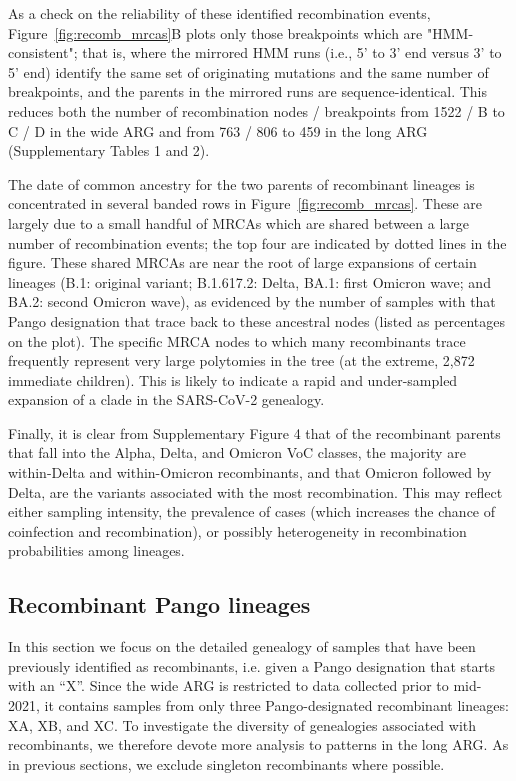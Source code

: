 \documentclass{article}
\begin{document}
As a check on the reliability of these identified recombination events,
Figure~\ref{fig:recomb_mrcas}B  plots only those breakpoints which are
"HMM-consistent"; that is, where the mirrored HMM runs (i.e., 5’ to 3’ end
versus 3’ to 5’ end) identify the same set of originating mutations and the
same number of breakpoints, and the parents in the mirrored runs are
sequence-identical. This reduces both the number of recombination nodes /
breakpoints from 1522 / B to C / D in the wide ARG and from 763 / 806 to 459 in
the long ARG (Supplementary Tables 1 and 2).

The date of common ancestry for the two parents of recombinant lineages is
concentrated in several banded rows in Figure~\ref{fig:recomb_mrcas}. These are
largely due to a small handful of MRCAs which are shared between a large number
of recombination events; the top four are indicated by dotted lines in the
figure. These shared MRCAs are near the root of large expansions of certain
lineages (B.1: original variant;  B.1.617.2: Delta, BA.1: first Omicron wave;
and BA.2: second Omicron wave), as evidenced by the number of samples with that
Pango designation that trace back to these ancestral nodes (listed as
percentages on the plot). The specific MRCA nodes to which many recombinants
trace frequently represent very large polytomies in the tree (at the extreme,
2,872 immediate children). This is likely to indicate a rapid and under-sampled
expansion of a clade in the SARS-CoV-2 genealogy.

Finally, it is clear from Supplementary Figure 4 that of the recombinant
parents that fall into the Alpha, Delta, and Omicron VoC classes, the majority
are within-Delta and within-Omicron recombinants, and that Omicron followed by
Delta, are the variants associated with the most recombination. This may
reflect either sampling intensity, the prevalence of cases (which increases the
chance of coinfection and recombination), or possibly heterogeneity in
recombination probabilities among lineages.

\subsection{Recombinant Pango lineages}

In this section we focus on the detailed genealogy of samples that have been
previously identified as recombinants, i.e. given a Pango designation that
starts with an ``X''. Since the wide ARG is restricted to data collected prior
to mid-2021, it contains samples from only three Pango-designated recombinant
lineages: XA, XB, and XC. To investigate the diversity of genealogies
associated with recombinants, we therefore devote more analysis to patterns in
the long ARG. As in previous sections, we exclude singleton recombinants where
possible.
\end{document}
